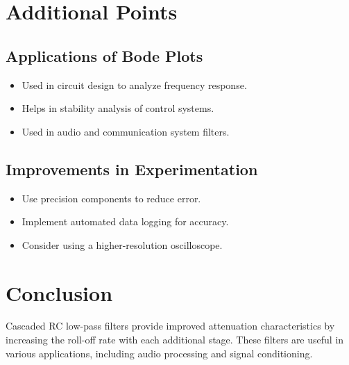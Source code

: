 \documentclass{article}
\begin{document}
\section{Additional Points}
\subsection{Applications of Bode Plots}
\begin{itemize}
    \item Used in circuit design to analyze frequency response.
    \item Helps in stability analysis of control systems.
    \item Used in audio and communication system filters.
\end{itemize}

\subsection{Improvements in Experimentation}
\begin{itemize}
    \item Use precision components to reduce error.
    \item Implement automated data logging for accuracy.
    \item Consider using a higher-resolution oscilloscope.
\end{itemize}
\section{Conclusion}
Cascaded RC low-pass filters provide improved attenuation characteristics by increasing the roll-off rate with each additional stage. These filters are useful in various applications, including audio processing and signal conditioning.
\end{document}
